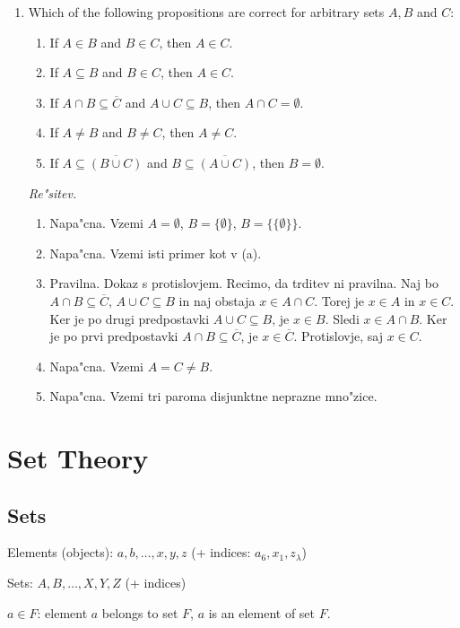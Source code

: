 \documentclass[11pt,paper=b5,footinclude,headinclude]{scrbook} %
\theoremstyle{remark}
\theoremstyle{definition} %
\theoremstyle{theorem} %
\begin{document}
\begin{enumerate}
\item Which of the following propositions are correct for arbitrary sets $A, B$ and $C$:
\begin{enumerate}
\item If $A\in B$ and $B\in C$, then $A\in C$.
\item If $A\subseteq B$ and $B\in C$, then $A\in C$.
\item If $A\cap B\subseteq \overline{C}$ and $A\cup C \subseteq B$, then $A\cap C = \emptyset$.
\item If $A\neq B$ and $B\neq C$, then $A\neq C$.
\item If $A\subseteq \overline{(B\cup C)}$ and $B\subseteq \overline{(A\cup C)}$, then $B=\emptyset$.
\end{enumerate}

\emph{ Re"sitev.}
\begin{enumerate}
\item Napa"cna. Vzemi $A=\emptyset$, $B=\{\emptyset\}$, $B=\{\{\emptyset\}\}$.
\item Napa"cna. Vzemi isti primer kot v (a).
\item Pravilna. Dokaz s protislovjem. Recimo, da trditev ni pravilna. Naj bo $A\cap B\subseteq \overline{C}$, $A\cup C\subseteq B$  in naj obstaja $x\in A\cap C$. Torej je $x\in A$ in $x\in C$. Ker je po drugi predpostavki $A\cup C\subseteq B$, je $x\in B$. Sledi $x\in A \cap B$. Ker je po prvi predpostavki $A\cap B\subseteq \overline{C}$, je $x\in \overline{C}$. Protislovje, saj $x\in C$. 
\item Napa"cna. Vzemi $A=C\neq B$.
\item Napa"cna. Vzemi tri paroma disjunktne neprazne mno"zice.
\end{enumerate}

\end{enumerate}


\chapter{Set Theory}

\section{Sets}

Elements (objects): $a,b,\ldots, x,y,z$ (+ indices: $a_6, x_1, z_\lambda$)

Sets: $A,B,\ldots, X,Y,Z$ (+ indices)

$a\in F$: element $a$ belongs to set $F$, $a$ is an element of set $F$.
\end{document}
